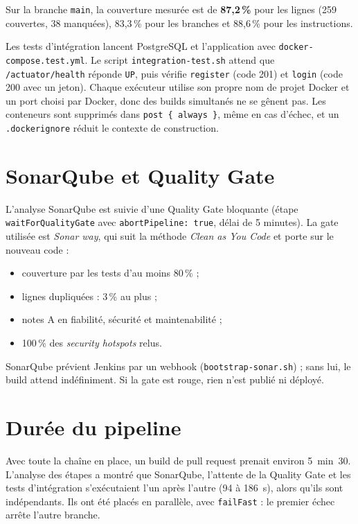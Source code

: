 \documentclass[11pt,a4paper]{report}
\begin{document}
Sur la branche \texttt{main}, la couverture mesurée est de \textbf{87,2\,\%} pour les lignes (259 couvertes, 38 manquées), 83,3\,\% pour les branches et 88,6\,\% pour les instructions.

Les tests d'intégration lancent PostgreSQL et l'application avec \texttt{docker-compose.test.yml}. Le script \texttt{integration-test.sh} attend que \texttt{/actuator/health} réponde \texttt{UP}, puis vérifie \texttt{register} (code 201) et \texttt{login} (code 200 avec un jeton). Chaque exécuteur utilise son propre nom de projet Docker et un port choisi par Docker, donc des builds simultanés ne se gênent pas. Les conteneurs sont supprimés dans \texttt{post \{ always \}}, même en cas d'échec, et un \texttt{.dockerignore} réduit le contexte de construction.

\section{SonarQube et Quality Gate}
L'analyse SonarQube est suivie d'une Quality Gate bloquante (étape \texttt{waitForQualityGate} avec \texttt{abortPipeline: true}, délai de 5 minutes). La gate utilisée est \emph{Sonar way}, qui suit la méthode \emph{Clean as You Code} et porte sur le nouveau code :
\begin{itemize}
  \item couverture par les tests d'au moins 80\,\% ;
  \item lignes dupliquées : 3\,\% au plus ;
  \item notes A en fiabilité, sécurité et maintenabilité ;
  \item 100\,\% des \emph{security hotspots} relus.
\end{itemize}
SonarQube prévient Jenkins par un webhook (\texttt{bootstrap-sonar.sh}) ; sans lui, le build attend indéfiniment. Si la gate est rouge, rien n'est publié ni déployé.

\section{Durée du pipeline}
Avec toute la chaîne en place, un build de pull request prenait environ 5~min~30. L'analyse des étapes a montré que SonarQube, l'attente de la Quality Gate et les tests d'intégration s'exécutaient l'un après l'autre (94 à 186~s), alors qu'ils sont indépendants. Ils ont été placés en parallèle, avec \texttt{failFast} : le premier échec arrête l'autre branche.
\end{document}

